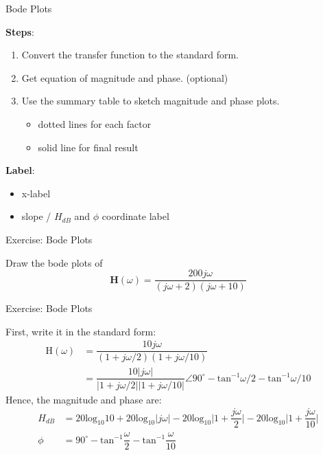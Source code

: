 \documentclass{beamer}
\begin{document}

\begin{frame}{Bode Plots}

\textbf{Steps}:
\begin{enumerate}
\item Convert the transfer function to the standard form.
\item Get equation of magnitude and phase. (optional)
\item Use the summary table to sketch magnitude and phase plots. 
\begin{itemize}
\item dotted lines for each factor
\item solid line for final result
\end{itemize}
\end{enumerate}

\textbf{Label}:
\begin{itemize}
\item x-label
\item slope / $H_{dB}$ and $\phi$ coordinate label
\end{itemize}
\end{frame}



\begin{frame}{Exercise: Bode Plots}

Draw the bode plots of
$$\mathbf{H}(\omega)=\dfrac{200j \omega}{(j \omega+2)(j \omega+10)}$$

\end{frame}


\begin{frame}{Exercise: Bode Plots}

First, write it in the standard form:
\begin{equation*}
\begin{aligned}
\mathrm{H}(\omega)&=\dfrac{10j \omega}{(1+j \omega /2)(1+j \omega/10)}\\
&=\dfrac{10\lvert j \omega \rvert}{\lvert 1+j \omega /2 \rvert \lvert 1+j \omega/10 \rvert} \angle 90^{\circ}-\mathrm{tan}^{-1}\omega /2-\mathrm{tan}^{-1}\omega /10
\end{aligned}
\end{equation*}
Hence, the magnitude and phase are:
\begin{equation*}
\begin{aligned}
H_{dB}&=20 \mathrm{log}_{10}10+20\mathrm{log}_{10} \lvert j \omega \rvert -20 \mathrm{log}_{10} \lvert 1+ \dfrac{j \omega}{2} \rvert-20\mathrm{log}_{10} \lvert 1+\dfrac{j \omega}{10} \rvert\\
\phi &=90^{\circ}-\mathrm{tan}^{-1}\dfrac{\omega}{2}-\mathrm{tan}^{-1}\dfrac{\omega}{10}
\end{aligned}
\end{equation*}
\end{frame}
\end{document}
